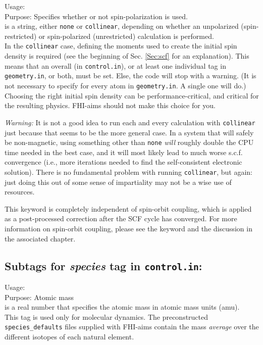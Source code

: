 {
 \noindent
 Usage:   \\[1.0ex]
 Purpose: Specifies whether or not spin-polarization is used. \\[1.0ex]
  is a string, either \texttt{none} or
 \texttt{collinear}, depending on whether an unpolarized (spin-restricted) or
 spin-polarized (unrestricted) calculation is performed. \\
}
In the \texttt{collinear} case, defining the moments used to create the
initial spin density is required (see the beginning of Sec. \ref{Sec:scf} for
an explanation). This means that an overall 
(in \texttt{control.in}), or at least one individual 
tag in \texttt{geometry.in}, or both, must be set. Else, the code will stop
with a warning. (It is not necessary to specify  for
every atom in \texttt{geometry.in}. A single one will do.) Choosing the right
initial spin density can be performance-critical, and critical for the
resulting physics. FHI-aims should not make this choice for you.

\emph{Warning:} It is not a good idea to run each and every calculation
with  \texttt{collinear} just because that seems to be
the more general case. In a system that will safely be non-magnetic,
using something other than  \texttt{none} \emph{will}
roughly double the CPU time needed in the best case, and it will most
likely lead to much worse s.c.f. convergence (i.e., more iterations
needed to find the self-consistent electronic solution). There is no
fundamental problem with running  \texttt{collinear}, but
again: just doing this out of some sense of impartiality may not be a
wise use of resources.

This keyword is completely independent of spin-orbit coupling, which is
applied as a post-processed correction after the SCF cycle has converged.  
For more information on spin-orbit coupling, please see the 
 keyword and the discussion in the associated
chapter.

\newpage

\subsection*{Subtags for \emph{species} tag in \texttt{control.in}:}

{
  \noindent
  Usage:   \\[1.0ex]
  Purpose: Atomic mass\\[1.0ex]
   is a real number that specifies the atomic mass in atomic
  mass units (amu).\\
}
This tag is used only for molecular dynamics. The preconstructed
\texttt{species\_defaults} files supplied with FHI-aims contain
the mass \emph{average} over the different isotopes of each natural
element. 

